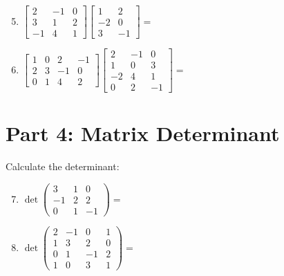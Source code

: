 \documentclass{article}
\begin{document}
\begin{enumerate}
	\setcounter{enumi}{4}
	\item $\begin{bmatrix} 2 & -1 & 0 \\ 3 & 1 & 2 \\ -1 & 4 & 1 \end{bmatrix} \begin{bmatrix} 1 & 2 \\ -2 & 0 \\ 3 & -1 \end{bmatrix} = $ \underline{\hspace{3cm}}
	
	\item $\begin{bmatrix} 1 & 0 & 2 & -1 \\ 2 & 3 & -1 & 0 \\ 0 & 1 & 4 & 2 \end{bmatrix} \begin{bmatrix} 2 & -1 & 0 \\ 1 & 0 & 3 \\ -2 & 4 & 1 \\ 0 & 2 & -1 \end{bmatrix} = $ \underline{\hspace{3cm}}
\end{enumerate}

\section*{Part 4: Matrix Determinant}
Calculate the determinant:

\begin{enumerate}
	\setcounter{enumi}{6}
	\item $\det\begin{pmatrix} 3 & 1 & 0 \\ -1 & 2 & 2 \\ 0 & 1 & -1 \end{pmatrix} = $ \underline{\hspace{3cm}}
	
	\item $\det\begin{pmatrix} 2 & -1 & 0 & 1 \\ 1 & 3 & 2 & 0 \\ 0 & 1 & -1 & 2 \\ 1 & 0 & 3 & 1 \end{pmatrix} = $ \underline{\hspace{3cm}}
\end{enumerate}
\end{document}
